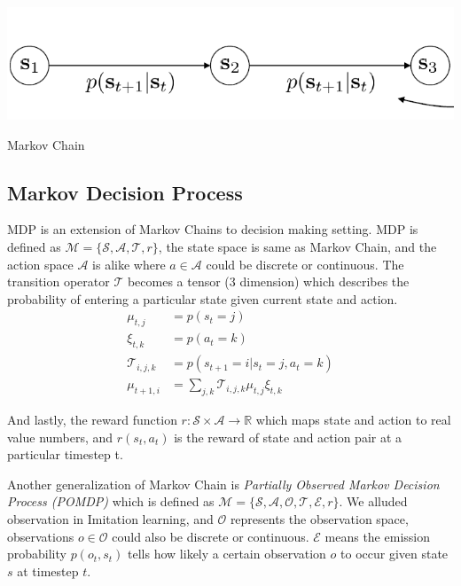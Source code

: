 \documentclass{tufte-handout}
\begin{document}
\begin{marginfigure}
  \centering
  \includegraphics[width=\linewidth]{mchain}
  \caption{Markov Chain}
  \label{fig:mchain}
\end{marginfigure}

\subsection{Markov Decision Process}

MDP is an extension of Markov Chains to decision making setting. MDP is defined as $\mathcal{M}=\{\mathcal{S}, \mathcal{A}, \mathcal{T}, r \} $, the state space is same as Markov Chain, and the action space $\mathcal{A}$ is alike where $ a \in \mathcal{A}$ could be discrete or continuous. The transition operator $\mathcal{T}$ becomes a tensor (3 dimension) which describes the probability of entering a particular state given current state and action.
\begin{align*}
 \mu_{t,j} &= p(s_t = j) \\
 \xi_{t, k} &= p(a_t = k) \\
 \mathcal{T}_{i,j,k} &= p(s_{t+1} = i | s_t = j, a_t = k) \\
 \mu_{t+1,i} &= \sum_{j,k} \mathcal{T}_{i,j,k} \mu_{t,j} \xi_{t,k}
\end{align*}

And lastly, the reward function $r: \mathcal{S} \times \mathcal{A} \to \mathbb{R}$ which maps state and action to real value numbers, and $r(s_t, a_t) $ is the reward of state and action pair at a particular timestep t.

Another generalization of Markov Chain is \emph{Partially Observed Markov Decision Process (POMDP)} which is defined as
$\mathcal{M} = \{\mathcal{S}, \mathcal{A}, \mathcal{O}, \mathcal{T}, \mathcal{E}, r \} $. We alluded observation in Imitation learning, and $\mathcal{O}$
represents the observation space, observations $o \in \mathcal{O}$ could also be discrete or continuous. $\mathcal{E}$ means the emission probability
 $p(o_t, s_t)$ tells how likely a certain observation $o$ to occur given state $s$ at timestep $t$.
\end{document}
